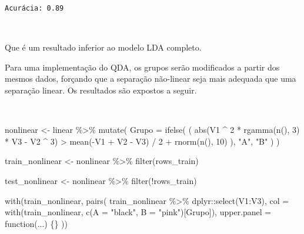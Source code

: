\documentclass[
  a4paperpaper,
]{article}
\newenvironment{Shaded}{\begin{snugshade}}{\end{snugshade}}
\newcommand{\AttributeTok}[1]{\textcolor[rgb]{0.40,0.45,0.13}{#1}}
\newcommand{\ControlFlowTok}[1]{\textcolor[rgb]{0.00,0.23,0.31}{#1}}
\newcommand{\DecValTok}[1]{\textcolor[rgb]{0.68,0.00,0.00}{#1}}
\newcommand{\FunctionTok}[1]{\textcolor[rgb]{0.28,0.35,0.67}{#1}}
\newcommand{\NormalTok}[1]{\textcolor[rgb]{0.00,0.23,0.31}{#1}}
\newcommand{\OtherTok}[1]{\textcolor[rgb]{0.00,0.23,0.31}{#1}}
\newcommand{\SpecialCharTok}[1]{\textcolor[rgb]{0.37,0.37,0.37}{#1}}
\newcommand{\StringTok}[1]{\textcolor[rgb]{0.13,0.47,0.30}{#1}}
\begin{document}
\begin{verbatim}
Acurácia: 0.89
\end{verbatim}

~

Que é um resultado inferior ao modelo LDA completo.

Para uma implementação do QDA, os grupos serão modificados a partir dos
mesmos dados, forçando que a separação não-linear seja mais adequada que
uma separação linear. Os resultados são expostos a seguir.

~

\begin{Shaded}
\begin{Highlighting}[]
\NormalTok{nonlinear }\OtherTok{\textless{}{-}}\NormalTok{ linear }\SpecialCharTok{\%\textgreater{}\%}
  \FunctionTok{mutate}\NormalTok{(}
    \AttributeTok{Grupo =} \FunctionTok{ifelse}\NormalTok{(}
\NormalTok{      (}
        \FunctionTok{abs}\NormalTok{(V1 }\SpecialCharTok{\^{}} \DecValTok{2} \SpecialCharTok{*} \FunctionTok{rgamma}\NormalTok{(}\FunctionTok{n}\NormalTok{(), }\DecValTok{3}\NormalTok{) }\SpecialCharTok{*}\NormalTok{ V3 }\SpecialCharTok{{-}}\NormalTok{ V2 }\SpecialCharTok{\^{}} \DecValTok{3}\NormalTok{) }\SpecialCharTok{\textgreater{}}
          \FunctionTok{mean}\NormalTok{(}\SpecialCharTok{{-}}\NormalTok{V1 }\SpecialCharTok{+}\NormalTok{ V2 }\SpecialCharTok{{-}}\NormalTok{ V3) }\SpecialCharTok{/} \DecValTok{2} \SpecialCharTok{+} \FunctionTok{rnorm}\NormalTok{(}\FunctionTok{n}\NormalTok{(), }\DecValTok{10}\NormalTok{)}
\NormalTok{      ),}
      \StringTok{"A"}\NormalTok{, }\StringTok{"B"}
\NormalTok{    )}
\NormalTok{  )}

\NormalTok{train\_nonlinear }\OtherTok{\textless{}{-}}\NormalTok{ nonlinear }\SpecialCharTok{\%\textgreater{}\%}
  \FunctionTok{filter}\NormalTok{(rows\_train)}

\NormalTok{test\_nonlinear }\OtherTok{\textless{}{-}}\NormalTok{ nonlinear }\SpecialCharTok{\%\textgreater{}\%}
  \FunctionTok{filter}\NormalTok{(}\SpecialCharTok{!}\NormalTok{rows\_train)}

\FunctionTok{with}\NormalTok{(train\_nonlinear, }\FunctionTok{pairs}\NormalTok{(}
\NormalTok{  train\_nonlinear }\SpecialCharTok{\%\textgreater{}\%}\NormalTok{ dplyr}\SpecialCharTok{::}\FunctionTok{select}\NormalTok{(V1}\SpecialCharTok{:}\NormalTok{V3),}
  \AttributeTok{col =} \FunctionTok{with}\NormalTok{(train\_nonlinear, }\FunctionTok{c}\NormalTok{(}\AttributeTok{A =} \StringTok{"black"}\NormalTok{, }\AttributeTok{B =} \StringTok{"pink"}\NormalTok{)[Grupo]),}
  \AttributeTok{upper.panel =} \ControlFlowTok{function}\NormalTok{(...) \{\}}
\NormalTok{))}
\end{Highlighting}
\end{Shaded}
\end{document}
